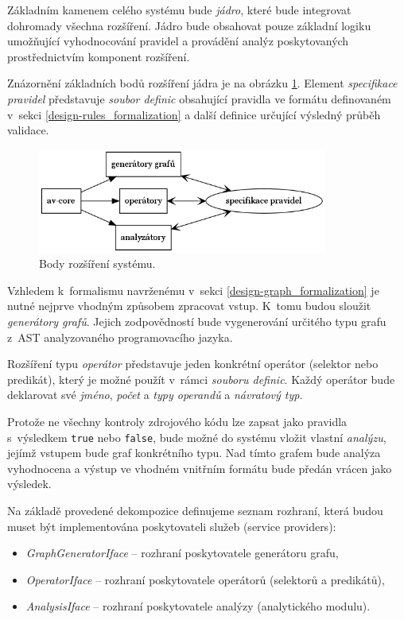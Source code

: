 Základním kamenem celého systému bude \emph{jádro}, které bude integrovat dohromady všechna rozšíření. Jádro bude obsahovat pouze základní logiku umožňující vyhodnocování pravidel a provádění analýz poskytovaných prostřednictvím komponent rozšíření.

Znázornění základních bodů rozšíření jádra je na obrázku \ref{design-system_extensions}. Element \emph{specifikace pravidel} představuje \emph{soubor definic} obsahující pravidla ve formátu definovaném v~sekci \ref{design-rules_formalization} a další definice určující výsledný průběh validace.

\begin{figure}[h!]
  \centering
  \includegraphics[width=0.85\textwidth]{./graphs/system_extensions.png}
  \caption{Body rozšíření systému.\label{design-system_extensions}}
\end{figure}

Vzhledem k~formalismu navrženému v~sekci \ref{design-graph_formalization} je nutné nejprve vhodným způsobem zpracovat vstup. K~tomu budou sloužit \emph{generátory grafů}. Jejich zodpovědností bude vygenerování určitého typu grafu z~AST analyzovaného programovacího jazyka.

Rozšíření typu \emph{operátor} představuje jeden konkrétní operátor (selektor nebo predikát), který je možné použít v~rámci \emph{souboru definic}. Každý operátor bude deklarovat své \emph{jméno}, \emph{počet} a \emph{typy operandů} a \emph{návratový typ}.

Protože ne všechny kontroly zdrojového kódu lze zapsat jako pravidla s~výsledkem \verb+true+ nebo \verb+false+, bude možné do systému vložit vlastní \emph{analýzu}, jejímž vstupem bude graf konkrétního typu. Nad tímto grafem bude analýza vyhodnocena a výstup ve vhodném vnitřním formátu bude předán vrácen jako výsledek.

Na základě provedené dekompozice definujeme seznam rozhraní, která budou muset být implementována poskytovateli služeb (service providers):

\begin{itemize}
\item \emph{GraphGeneratorIface} -- rozhraní poskytovatele generátoru grafu,
\item \emph{OperatorIface} -- rozhraní poskytovatele operátorů (selektorů a predikátů),
\item \emph{AnalysisIface} -- rozhraní poskytovatele analýzy (analytického modulu).
\end{itemize}

